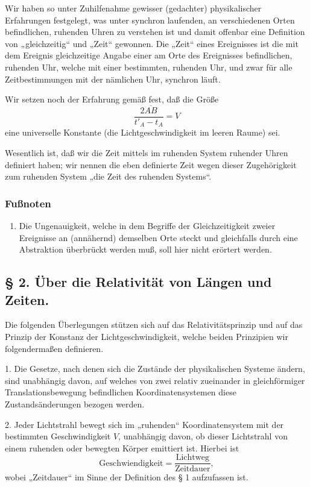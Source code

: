 \documentclass[17pt]{webarticle}       %
\begin{document}
Wir haben so unter Zuhilfenahme gewisser (gedachter) physikalischer Erfahrungen festgelegt, was unter synchron laufenden, an verschiedenen Orten befindlichen, ruhenden Uhren zu verstehen ist und damit offenbar eine Definition von „gleichzeitig“ und „Zeit“ gewonnen. Die „Zeit“ eines Ereignisses ist die mit dem Ereignis gleichzeitige Angabe einer am Orte des Ereignisses befindlichen, ruhenden Uhr, welche mit einer bestimmten, ruhenden Uhr, und zwar für alle Zeitbestimmungen mit der nämlichen Uhr, synchron läuft.

Wir setzen noch der Erfahrung gemäß fest, daß die Größe
\[
\frac{2 \overline{A B}}{t'_A - t_A} = V
\]
eine universelle Konstante (die Lichtgeschwindigkeit im leeren Raume) sei.

Wesentlich ist, daß wir die Zeit mittels im ruhenden System ruhender Uhren definiert haben; wir nennen die eben definierte Zeit wegen dieser Zugehörigkeit zum ruhenden System „die Zeit des ruhenden Systems“.

\subsubsection*{Fußnoten}

\begin{enumerate}
\item\label{footnote-1} Die Ungenauigkeit, welche in dem Begriffe der Gleichzeitigkeit zweier Ereignisse an (annähernd) demselben Orte steckt und gleichfalls durch eine Abstraktion überbrückt werden muß, soll hier nicht erörtert werden.
\end{enumerate}

\subsection*{§ 2. Über die Relativität von Längen und Zeiten.}

Die folgenden Überlegungen stützen sich auf das Relativitätsprinzip und auf das Prinzip der Konstanz der Lichtgeschwindigkeit, welche beiden Prinzipien wir folgendermaßen definieren.

1. Die Gesetze, nach denen sich die Zustände der physikalischen Systeme ändern, sind unabhängig davon, auf welches von zwei relativ zueinander in gleichförmiger Translationsbewegung befindlichen Koordinatensystemen diese Zustandsänderungen bezogen werden.

2. Jeder Lichtstrahl bewegt sich im „ruhenden“ Koordinatensystem mit der bestimmten Geschwindigkeit \( V \), unabhängig davon, ob dieser Lichtstrahl von einem ruhenden oder bewegten Körper emittiert ist. Hierbei ist
\[
\text{Geschwiendigkeit} = \frac{\text{Lichtweg}}{\text{Zeitdauer}} ,
\]
wobei „Zeitdauer“ im Sinne der Definition des § 1 aufzufassen ist.
\end{document}
